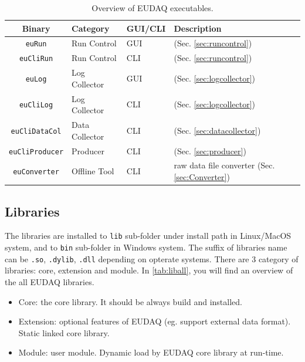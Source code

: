 \begin{table}
\centering
\small
\begin{tabular}{ c | l | l | p{4cm}}
  \textbf{Binary} & \textbf{Category} & \textbf{GUI/CLI}  & \textbf{Description}\\
  \hline
  \hline
  \texttt{euRun} & Run Control & GUI & (Sec. \ref{sec:runcontrol}) \\
  \texttt{euCliRun} & Run Control & CLI & (Sec. \ref{sec:runcontrol}) \\
  \texttt{euLog} & Log Collector & GUI & (Sec. \ref{sec:logcollector}) \\
  \texttt{euCliLog} & Log Collector & CLI & (Sec. \ref{sec:logcollector}) \\
  \texttt{euCliDataCol} & Data Collector & CLI & (Sec. \ref{sec:datacollector}) \\
  \texttt{euCliProducer} & Producer & CLI & (Sec. \ref{sec:producer}) \\
  \hline
  \texttt{euConverter} & Offline Tool & CLI & raw data file converter (Sec. \ref{sec:Converter}) \\
\end{tabular}
\caption{Overview of EUDAQ executables.}
\label{tab:exesall}
\end{table}


\subsection{Libraries}
The libraries are installed to \texttt{lib} sub-folder under install path in Linux/MacOS system, and to \texttt{bin} sub-folder in Windows system. The suffix of libraries name can be \texttt{.so}, \texttt{.dylib}, \texttt{.dll} depending on opterate systems. There are 3 category of libraries: core, extension and module. In \autoref{tab:liball}, you will find an overview of the all EUDAQ libraries.\\

\begin{itemize}
\item Core: the core library. It should be always build and installed.
\item Extension: optional features of EUDAQ (eg. support external data format). Static linked core library.
\item Module: user module. Dynamic load by EUDAQ core library at run-time.
\end{itemize}

